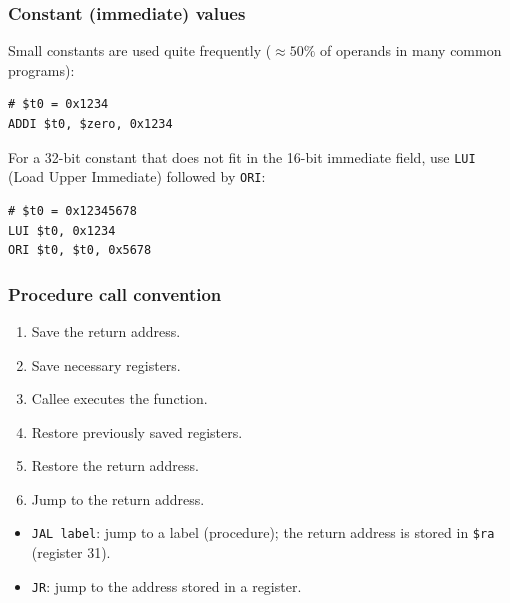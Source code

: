 \subsubsection{Constant (immediate) values}

Small constants are used quite frequently ($\approx 50\%$ of operands in
many common programs):
\begin{eg}
\leavevmode
\begin{lstlisting}
# $t0 = 0x1234
ADDI $t0, $zero, 0x1234
\end{lstlisting}
For a 32-bit constant that does not fit in the 16-bit immediate field, use
\texttt{LUI} (Load Upper Immediate) followed by \texttt{ORI}:
\begin{lstlisting}
# $t0 = 0x12345678
LUI $t0, 0x1234
ORI $t0, $t0, 0x5678
\end{lstlisting}
\end{eg}

\subsubsection{Procedure call convention}

\begin{definition}
\leavevmode
\begin{enumerate}
  \item Save the return address.
  \item Save necessary registers.
  \item Callee executes the function.
  \item Restore previously saved registers.
  \item Restore the return address.
  \item Jump to the return address.
\end{enumerate}
\end{definition}
\begin{itemize}
  \item \texttt{JAL label}: jump to a label (procedure); the return address
  is stored in \texttt{\$ra} (register 31).
  \item \texttt{JR}: jump to the address stored in a register.
\end{itemize}

